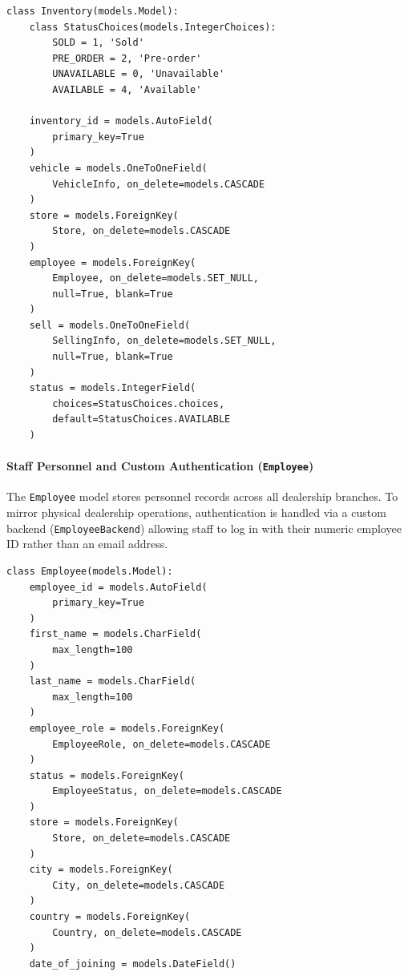 \begin{tcolorbox}[title=\textbf{Listing 5.3: Physical Stock Model (\texttt{Inventory})}, colback=gray!4, colframe=indigo!70!black, arc=2pt, boxrule=0.6pt, left=6pt, right=6pt, top=4pt, bottom=4pt]
\footnotesize
\begin{verbatim}
class Inventory(models.Model):
    class StatusChoices(models.IntegerChoices):
        SOLD = 1, 'Sold'
        PRE_ORDER = 2, 'Pre-order'
        UNAVAILABLE = 0, 'Unavailable'
        AVAILABLE = 4, 'Available'

    inventory_id = models.AutoField(
        primary_key=True
    )
    vehicle = models.OneToOneField(
        VehicleInfo, on_delete=models.CASCADE
    )
    store = models.ForeignKey(
        Store, on_delete=models.CASCADE
    )
    employee = models.ForeignKey(
        Employee, on_delete=models.SET_NULL,
        null=True, blank=True
    )
    sell = models.OneToOneField(
        SellingInfo, on_delete=models.SET_NULL,
        null=True, blank=True
    )
    status = models.IntegerField(
        choices=StatusChoices.choices,
        default=StatusChoices.AVAILABLE
    )
\end{verbatim}
\end{tcolorbox}

\paragraph{Staff Personnel and Custom Authentication (\texttt{Employee})}
The \texttt{Employee} model stores personnel records across all dealership branches. To mirror physical dealership operations, authentication is handled via a custom backend (\texttt{EmployeeBackend}) allowing staff to log in with their numeric employee ID rather than an email address.

\begin{tcolorbox}[title=\textbf{Listing 5.4: Employee Personnel Model (\texttt{Employee})}, colback=gray!4, colframe=indigo!70!black, arc=2pt, boxrule=0.6pt, left=6pt, right=6pt, top=4pt, bottom=4pt]
\footnotesize
\begin{verbatim}
class Employee(models.Model):
    employee_id = models.AutoField(
        primary_key=True
    )
    first_name = models.CharField(
        max_length=100
    )
    last_name = models.CharField(
        max_length=100
    )
    employee_role = models.ForeignKey(
        EmployeeRole, on_delete=models.CASCADE
    )
    status = models.ForeignKey(
        EmployeeStatus, on_delete=models.CASCADE
    )
    store = models.ForeignKey(
        Store, on_delete=models.CASCADE
    )
    city = models.ForeignKey(
        City, on_delete=models.CASCADE
    )
    country = models.ForeignKey(
        Country, on_delete=models.CASCADE
    )
    date_of_joining = models.DateField()
\end{verbatim}
\end{tcolorbox}

